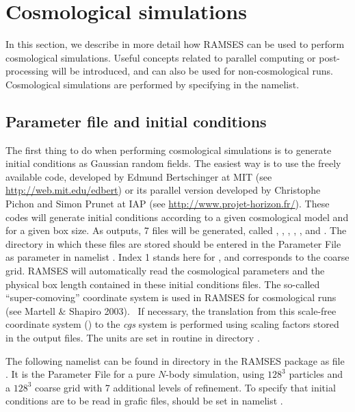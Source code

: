 \clearpage
\section{Cosmological simulations}

In this section, we describe in more detail how RAMSES can be used to
perform cosmological simulations. Useful concepts related to parallel
computing or post-processing will be introduced, and can also be used
for non-cosmological runs. Cosmological simulations are performed by
specifying  in the 
namelist.

\subsection{Parameter file and initial conditions}
\label{sec:cosmo_init}

The first thing to do when performing cosmological simulations is to
generate initial conditions as Gaussian random fields. The easiest way
is to use the freely available  code, developed by Edmund
Bertschinger at MIT (see \url{http://web.mit.edu/edbert}) or its
parallel version  developed by Christophe Pichon and Simon
Prunet at IAP (see \url{http://www.projet-horizon.fr/}). These codes
will generate initial conditions according to a given cosmological model
and for a given box size. As outputs, 7 files will be generated, called
, , , ,
,  and . The directory in
which these files are stored should be entered in the Parameter File as
parameter  in namelist
. Index 1 stands here for ,
and corresponds to the coarse grid.  RAMSES will automatically read the
cosmological parameters and the physical box length contained in these
initial conditions files. The so-called ``super-comoving'' coordinate
system is used in RAMSES for cosmological runs (see Martell \& Shapiro
2003). \ If necessary, the translation from this scale-free coordinate
system () to the \emph{cgs} system is
performed using scaling factors stored in the output files. The units
are set in routine  in directory .

The following namelist can be found in directory  in the
RAMSES package as file . It is the Parameter File for a
pure $N$-body simulation, using $128^3$ particles and a $128^3$ coarse
grid with 7 additional levels of refinement. To specify that initial
conditions are to be read in grafic files,
 should be set in namelist
. 

